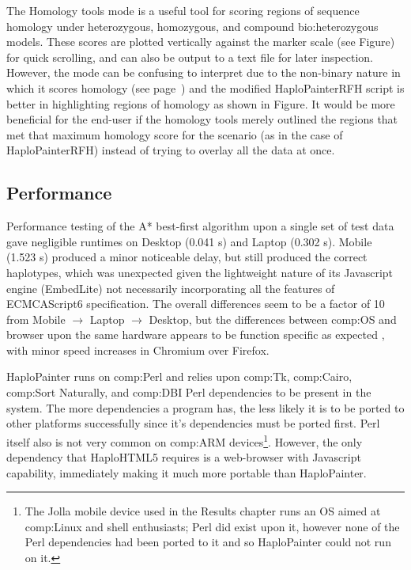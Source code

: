The Homology tools mode is a useful tool for scoring regions of sequence homology under heterozygous, homozygous, and compound \gls{bio:heterozygous} models. These scores are plotted vertically against the marker scale (see Figure) for quick scrolling, and can also be output to a text file for later inspection. However, the mode can be confusing to interpret due to the non-binary nature in which it scores homology (see page~\pageref{ref:haplo:homologyscoredet}) and the modified HaploPainterRFH script is better in highlighting regions of homology as shown in Figure. It would be more beneficial for the end-user if the homology tools merely outlined the regions that met that maximum homology score for the scenario (as in the case of HaploPainterRFH) instead of trying to overlay all the data at once.

\subsection{Performance}

Performance testing of the A* best-first algorithm upon a single set of test data gave negligible runtimes on Desktop (0.041 s) and Laptop (0.302 s). Mobile (1.523 s) produced a minor noticeable delay, but still produced the correct haplotypes, which was unexpected given the lightweight nature of its Javascript engine (EmbedLite) not necessarily incorporating all the features of ECMCAScript6 specification. The overall differences seem to be a factor of 10 from Mobile $\rightarrow$ Laptop $\rightarrow$ Desktop, but the differences between \gls{comp:OS} and browser upon the same hardware appears to be function specific as expected \cite{ratanaworabhan2010jsmeter}, with minor speed increases in Chromium over Firefox.

HaploPainter runs on \gls{comp:Perl} and relies upon \gls{comp:Tk}, \gls{comp:Cairo}, \gls{comp:Sort Naturally}, and \gls{comp:DBI} Perl dependencies to be present in the system. The more dependencies a program has, the less likely it is to be ported to other platforms successfully since it's dependencies must be ported first. Perl itself also is not very common on \gls{comp:ARM} devices\footnote{The Jolla mobile device used in the Results chapter runs an OS aimed at \gls{comp:Linux} and shell enthusiasts; Perl did exist upon it, however none of the Perl dependencies had been ported to it and so HaploPainter could not run on it.}. However, the only dependency that HaploHTML5 requires is a web-browser with Javascript capability, immediately making it much more portable than HaploPainter.

